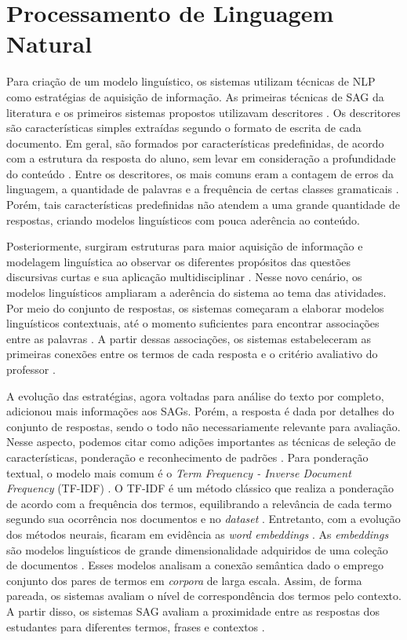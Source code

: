 \section{Processamento de Linguagem Natural}

Para criação de um modelo linguístico, os sistemas utilizam técnicas de NLP como estratégias de aquisição de informação. As primeiras técnicas de SAG da literatura e os primeiros sistemas propostos utilizavam descritores \cite{galhardi2018a}. Os descritores são características simples extraídas segundo o formato de escrita de cada documento. Em geral, são formados por características predefinidas, de acordo com a estrutura da resposta do aluno, sem levar em consideração a profundidade do conteúdo \cite{mohler2009}. Entre os descritores, os mais comuns eram a contagem de erros da linguagem, a quantidade de palavras e a frequência de certas classes gramaticais \cite{ galhardi2018b, riordan2019}. Porém, tais características predefinidas não atendem a uma grande quantidade de respostas, criando modelos linguísticos com pouca aderência ao conteúdo.

Posteriormente, surgiram estruturas para maior aquisição de informação e modelagem linguística ao observar os diferentes propósitos das questões discursivas curtas e sua aplicação multidisciplinar \cite{saha2018, kumar2019}. Nesse novo cenário, os modelos linguísticos ampliaram a aderência do sistema ao tema das atividades. Por meio do conjunto de respostas, os sistemas começaram a elaborar modelos linguísticos contextuais, até o momento suficientes para encontrar associações entre as palavras \cite{tan2020}. A partir dessas associações, os sistemas estabeleceram as primeiras conexões entre os termos de cada resposta e o critério avaliativo do professor \cite{sahu2020}.

A evolução das estratégias, agora voltadas para análise do texto por completo, adicionou mais informações aos SAGs. Porém, a resposta é dada por detalhes do conjunto de respostas, sendo o todo não necessariamente relevante para avaliação. Nesse aspecto, podemos citar como adições importantes as técnicas de seleção de características, ponderação e reconhecimento de padrões \cite{banjade2016}. Para ponderação textual, o modelo mais comum é o \textit{Term Frequency - Inverse Document Frequency} (TF-IDF) \cite{baeza2011}. O TF-IDF é um método clássico que realiza a ponderação de acordo com a frequência dos termos, equilibrando a relevância de cada termo segundo sua ocorrência nos documentos e no \textit{dataset} \cite{sultan2016}. Entretanto, com a evolução dos métodos neurais, ficaram em evidência as \textit{word embeddings} \cite{jurafsky2009}. As \textit{embeddings} são modelos linguísticos de grande dimensionalidade adquiridos de uma coleção de documentos \cite{goldberg2017}. Esses modelos analisam a conexão semântica dado o emprego conjunto dos pares de termos em \textit{corpora} de larga escala. Assim, de forma pareada, os sistemas avaliam o nível de correspondência dos termos pelo contexto. A partir disso, os sistemas SAG avaliam a proximidade entre as respostas dos estudantes para diferentes termos, frases e contextos \cite{sung2019b, ghavidel2020, galhardi2020, haller2022}.

